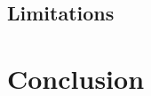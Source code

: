 \documentclass[xcolor=dvipsnames]{beamer}
\begin{document}
	\subsection{Limitations}

	
	\section{Conclusion}
	
\end{document}
